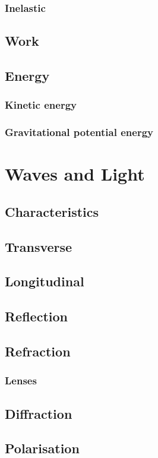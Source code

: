 \documentclass{book}
\begin{document}
\subsection{Inelastic}

\section{Work}

\section{Energy}
\subsection{Kinetic energy}

\subsection{Gravitational potential energy}

\chapter{Waves and Light}
\section{Characteristics}

\section{Transverse}

\section{Longitudinal}

\section{Reflection}

\section{Refraction}
\subsection{Lenses}


\section{Diffraction}

\section{Polarisation}
\end{document}

